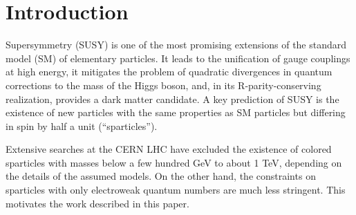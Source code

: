 \section{Introduction}
\label{sect:introduction}

Supersymmetry  (SUSY) \cite{Golfand:1971iw,Wess:1973kz,Wess:1974tw,Fayet1,Fayet2} is one of the most promising extensions of the 
standard model (SM) of elementary particles.  It leads to the unification of gauge couplings at
high energy, it mitigates the problem of quadratic divergences in quantum corrections to the
mass of the Higgs boson, and, in its R-parity-conserving realization, provides a dark matter candidate.
A key prediction of SUSY is the existence of new particles with the same properties as SM particles but
differing in spin by half a unit (``sparticles'').
%

Extensive searches at the CERN LHC have excluded the existence of colored sparticles with masses below a few hundred GeV to about 1 TeV,
depending on the details of the assumed models\cite{Chatrchyan:2012sa,Chatrchyan:2012te,Chatrchyan:2012ira,Chatrchyan:2012qka,Chatrchyan:2011ek,Chatrchyan:2012ola,Chatrchyan:2012bba,Chatrchyan:2012mea,Chatrchyan:2013xna,Chatrchyan:2013xsw,Chatrchyan:2013wxa,Chatrchyan:2013fea}. %
On the other hand, the constraints on sparticles with only electroweak quantum numbers are much less stringent.  This motivates the
work described in this paper.

